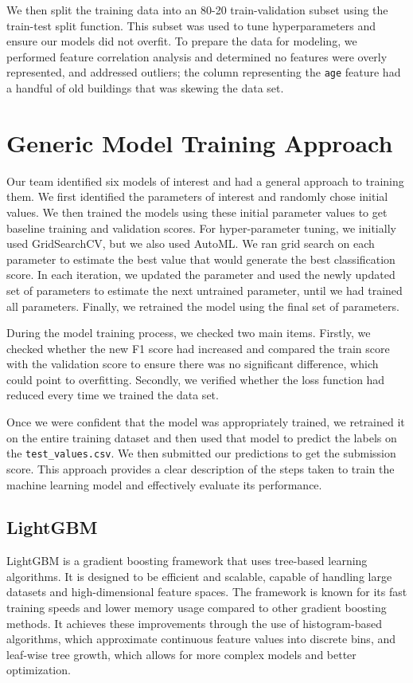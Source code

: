 \documentclass{article}
\begin{document}
We then split the training data into an 80-20 train-validation subset using the train-test split function.
This subset was used to tune hyperparameters and ensure our models did not overfit.
To prepare the data for modeling, we performed feature correlation analysis and determined no features were overly represented, and addressed outliers;
the column representing the \texttt{age} feature had a handful of old buildings that was skewing the data set.


\section{Generic Model Training Approach}

Our team identified six models of interest and had a general approach to training them.
We first identified the parameters of interest and randomly chose initial values.
We then trained the models using these initial parameter values to get baseline training and validation scores.
For hyper-parameter tuning, we initially used GridSearchCV, but we also used AutoML.
We ran grid search on each parameter to estimate the best value that would generate the best classification score.
In each iteration, we updated the parameter and used the newly updated set of parameters to estimate the next untrained parameter, until we had trained all parameters.
Finally, we retrained the model using the final set of parameters.

During the model training process, we checked two main items. 
Firstly, we checked whether the new F1 score had increased and compared the train score with the validation score to ensure there was no significant difference, which could point to overfitting.
Secondly, we verified whether the loss function had reduced every time we trained the data set.

Once we were confident that the model was appropriately trained, we retrained it on the entire training dataset and then used that model to predict the labels on the \texttt{test\_values.csv}.
We then submitted our predictions to get the submission score. This approach provides a clear description of the steps taken to train the machine learning model and effectively evaluate its performance.

\subsection{LightGBM}

LightGBM is a gradient boosting framework that uses tree-based learning algorithms.
It is designed to be efficient and scalable, capable of handling large datasets and high-dimensional feature spaces.
The framework is known for its fast training speeds and lower memory usage compared to other gradient boosting methods.
It achieves these improvements through the use of histogram-based algorithms, which approximate continuous feature values into discrete bins, and leaf-wise tree growth, which allows for more complex models and better optimization.
\end{document}
